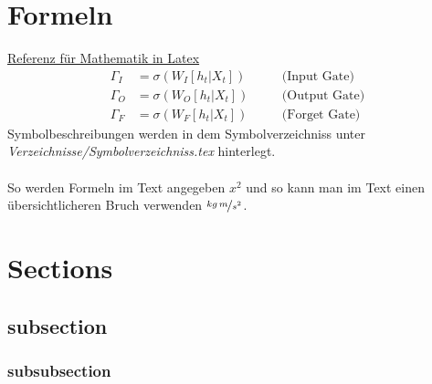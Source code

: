 \section{Formeln}
\label{sec:Formeln}
%
\href{https://en.wikibooks.org/wiki/LaTeX/Mathematics}{Referenz für Mathematik in Latex}
%
\begin{align}
	\label{eq:input_gate}
	\Gamma_I &= \sigma\left(W_{I}\left[h_t|X_t\right]\right)&&\quad\text{(Input Gate)}\\
	\label{eq:output_gate}
	\Gamma_O &= \sigma\left(W_{O}\left[h_t|X_t\right]\right)&&\quad\text{(Output Gate)}\\
	\label{eq:forget_gate}
	\Gamma_F &= \sigma\left(W_{F}\left[h_t|X_t\right]\right)&&\quad\text{(Forget Gate)}
\end{align}
%
Symbolbeschreibungen werden in dem Symbolverzeichniss unter \textit{Verzeichnisse/Symbolverzeichniss.tex} hinterlegt.\\\\
%
So werden Formeln im Text angegeben $x^2$ und so kann man im Text einen übersichtlicheren Bruch verwenden $\nicefrac{kg\,m}{s^2}$.
%
%
\section{Sections}
\label{sec:sections}
%
\subsection{subsection}
\label{subsec:subsection}
%
\subsubsection{subsubsection}
\label{subsubsec:subsubsection}
%
%
